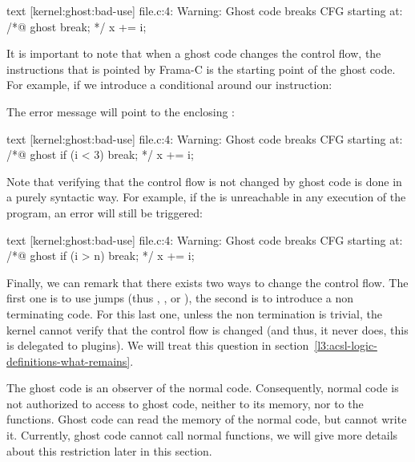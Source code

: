 \begin{CodeBlock}{text}
[kernel:ghost:bad-use] file.c:4: Warning:
  Ghost code breaks CFG starting at:
  /*@ ghost break; */
  x += i;
\end{CodeBlock}


It is important to note that when a ghost code changes the control
flow, the instructions that is pointed by Frama-C is the starting
point of the ghost code. For example, if we introduce a conditional
around our  instruction:




The error message will point to the enclosing :


\begin{CodeBlock}{text}
[kernel:ghost:bad-use] file.c:4: Warning:
  Ghost code breaks CFG starting at:
  /*@ ghost if (i < 3) break; */
  x += i;
\end{CodeBlock}


Note that verifying that the control flow is not changed by ghost
code is done in a purely syntactic way. For example, if the
 is unreachable in any execution of the program,
an error will still be triggered:




\begin{CodeBlock}{text}
[kernel:ghost:bad-use] file.c:4: Warning:
  Ghost code breaks CFG starting at:
  /*@ ghost if (i > n) break; */
  x += i;
\end{CodeBlock}


Finally, we can remark that there exists two ways to change the control
flow. The first one is to use jumps (thus ,
, or ), the second is to
introduce a non terminating code. For this last one, unless the non
termination is trivial, the kernel cannot verify that the control
flow is changed (and thus, it never does, this is delegated to plugins).
We will treat this question in
section~\ref{l3:acsl-logic-definitions-what-remains}.




The ghost code is an observer of the normal code. Consequently, normal
code is not authorized to access to ghost code, neither to its memory,
nor to the functions. Ghost code can read the memory of the normal code,
but cannot write it. Currently, ghost code cannot call normal functions,
we will give more details about this restriction later in this section.


